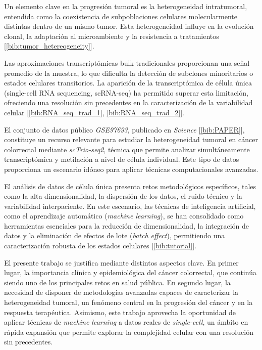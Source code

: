 \documentclass[11pt]{article}
\begin{document}
		
		Un elemento clave en la progresión tumoral es la heterogeneidad intratumoral, entendida como la coexistencia de subpoblaciones celulares molecularmente distintas dentro de un mismo tumor. Esta heterogeneidad influye en la evolución clonal, la adaptación al microambiente y la resistencia a tratamientos [\ref{bib:tumor_hetereogeneity}].
		
		Las aproximaciones transcriptómicas bulk tradicionales proporcionan una señal promedio de la muestra, lo que dificulta la detección de subclones minoritarios o estados celulares transitorios. La aparición de la transcriptómica de célula única (single-cell RNA sequencing, scRNA-seq) ha permitido superar esta limitación, ofreciendo una resolución sin precedentes en la caracterización de la variabilidad celular [\ref{bib:RNA_seq_trad_1}, \ref{bib:RNA_seq_trad_2}].
		
		El conjunto de datos público \textit{GSE97693}, publicado en \textit{Science} [\ref{bib:PAPER}], constituye un recurso relevante para estudiar la heterogeneidad tumoral en cáncer colorrectal mediante \textit{scTrio-seq2}, técnica que permite analizar simultáneamente transcriptómica y metilación a nivel de célula individual. Este tipo de datos proporciona un escenario idóneo para aplicar técnicas computacionales avanzadas.
		
		El análisis de datos de célula única presenta retos metodológicos específicos, tales como la alta dimensionalidad, la dispersión de los datos, el ruido técnico y la variabilidad interpaciente. En este escenario, las técnicas de inteligencia artificial, como el aprendizaje automático (\textit{machine learning}), se han consolidado como herramientas esenciales para la reducción de dimensionalidad, la integración de datos y la eliminación de efectos de lote (\textit{batch effect}), permitiendo una caracterización robusta de los estados celulares [\ref{bib:tutorial}].
		
		
		
		
		El presente trabajo se justifica mediante distintos aspectos clave. En primer lugar, la importancia clínica y epidemiológica del cáncer colorrectal, que continúa siendo uno de los principales retos en salud pública. En segundo lugar, la necesidad de disponer de metodologías avanzadas capaces de caracterizar la heterogeneidad tumoral, un fenómeno central en la progresión del cáncer y en la respuesta terapéutica. Asimismo, este trabajo aprovecha la oportunidad de aplicar técnicas de \textit{machine learning} a datos reales de \textit{single-cell}, un ámbito en rápida expansión que permite explorar la complejidad celular con una resolución sin precedentes. 
				
\end{document}
